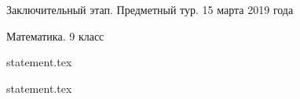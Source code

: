 \documentclass[a4paper,11pt, oneside]{book}
\begin{document}
\vspace{-3mm}
\vspace{-5mm}

\normalsize

\begin{center}
    Заключительный этап. Предметный тур. 15 марта 2019 года
    
    Математика. 9 класс
\end{center}

\parindent=0cm

{statement.tex}

\clearpage

{statement.tex}
\end{document}
